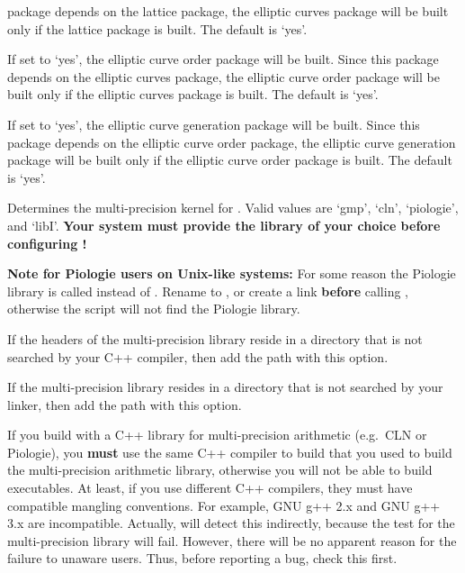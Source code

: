 \begin{description}
  package depends on the lattice package, the elliptic curves package will
  be built only if the lattice package is built.  The default is `yes'.
\item[\textcode{-{}-enable-eco}]
  If set to `yes', the elliptic curve order package will be built.  Since
  this package depends on the elliptic curves package, the elliptic curve
  order package will be built only if the elliptic curves package is built.
  The default is `yes'.
\item[\textcode{-{}-enable-gec}]
  If set to `yes', the elliptic curve generation package will be built.
  Since this package depends on the elliptic curve order package, the
  elliptic curve generation package will be built only if the elliptic curve
  order package is built.  The default is `yes'.
\item[\textcode{-{}-with-arithmetic}]
  Determines the multi-precision kernel for \LiDIA.  Valid values are
  `gmp', `cln', `piologie', and `libI'.  \textbf{Your system must provide
  the library of your choice before configuring \LiDIA!}

  \textbf{Note for Piologie users on Unix-like systems:} For some reason
  the Piologie library is called  instead of
  .  Rename  to ,
  or create a link \textbf{before} calling , otherwise the
   script will not find the Piologie library.

\item[\textcode{-{}-with-extra-includes}]
  If the headers of the multi-precision library reside in a directory that
  is not searched by your C++ compiler, then add the path with this option.
  \item[\textcode{-{}-with-extra-libs}] If the multi-precision library
  resides in a directory that is not searched by your linker, then add the
  path with this option.
\end{description}

\attentionIII If you build \LiDIA with a C++ library for multi-precision
arithmetic (e.g.\ CLN or Piologie), you \textbf{must} use the same C++
compiler to build \LiDIA that you used to build the multi-precision
arithmetic library, otherwise you will not be able to build executables.
At least, if you use different C++ compilers, they must have compatible
mangling conventions.  For example, GNU g++ 2.x and GNU g++ 3.x are
incompatible.  Actually,  will detect this indirectly,
because the test for the multi-precision library will fail.  However, there
will be no apparent reason for the failure to unaware users.  Thus, before
reporting a bug, check this first.

